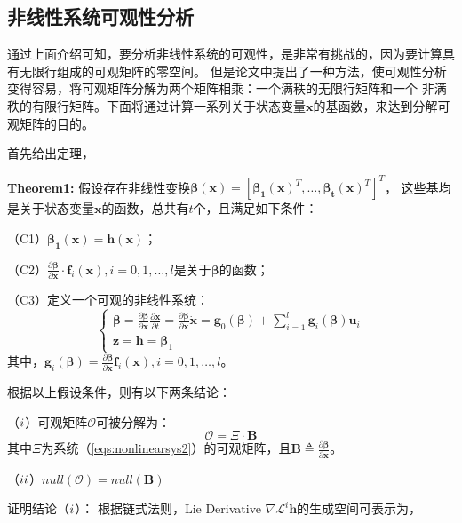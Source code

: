 \documentclass{article}
\begin{document}
\subsection{非线性系统可观性分析}
通过上面介绍可知，要分析非线性系统的可观性，是非常有挑战的，因为要计算具有无限行组成的可观矩阵的零空间。
但是论文中提出了一种方法，使可观性分析变得容易，将可观矩阵分解为两个矩阵相乘：一个满秩的无限行矩阵和一个
非满秩的有限行矩阵。下面将通过计算一系列关于状态变量$\textbf{x}$的基函数，来达到分解可观矩阵的目的。
\par
首先给出定理，
\par
\textbf{Theorem1:} 假设存在非线性变换$\mathbf{\beta(x)}=\left[\mathbf{\beta_1(x)}^T,\dots,\mathbf{\beta_t(x)}^T\right]^T$，
这些基均是关于状态变量$\textbf{x}$的函数，总共有$t$个，且满足如下条件：
\par
（C1）$\mathbf{\beta_1(x)}=\mathbf{h(x)}$；
\par
（C2）$\frac{\partial{\mathbf{\beta}}}{\partial{\textbf{x}}}\cdot\textbf{f}_i(\textbf{x}),i=0,1,\dots,l$是关于$\mathbf{\beta}$的函数；
\par
（C3）定义一个可观的非线性系统：
\begin{equation}\label{eqs:nonlinearsys2}
    \left\{ \begin{array}{l}
        \dot{\mathbf{\beta}}=\frac{\partial\mathbf{\beta}}{\partial\textbf{x}}\frac{\partial\textbf{x}}{\partial t}
            =\frac{\partial\mathbf{\beta}}{\partial\textbf{x}}\dot{\mathbf{x}}
            =\textbf{g}_0(\mathbf{\beta})+\sum_{i=1}^{l}{\textbf{g}_i(\mathbf{\beta})\textbf{u}_i}\\
        \textbf{z}=\textbf{h}=\mathbf{\beta}_1
    \end{array}\right.
\end{equation}
其中，$\textbf{g}_i(\mathbf{\beta})=\frac{\partial{\mathbf{\beta}}}{\partial{\textbf{x}}}\textbf{f}_i(\textbf{x}),i=0,1,\dots,l$。
\par
根据以上假设条件，则有以下两条结论：
\par
（$\romannumeral1$）可观矩阵$\mathcal{O}$可被分解为：
\begin{equation}
    \mathcal{O}=\Xi\cdot\mathbf{B}
\end{equation}
其中$\Xi$为系统（\ref{eqs:nonlinearsys2}）的可观矩阵，且$\mathbf{B}\triangleq\frac{\partial{\mathbf{\beta}}}{\partial{\textbf{x}}}$。
\par
（$\romannumeral2$）$null(\mathcal{O})=null(\mathbf{B})$
\par
证明结论（$\romannumeral1$）：
根据链式法则，Lie Derivative $\nabla\mathcal{L}^i\textbf{h}$的生成空间可表示为，
\end{document}
